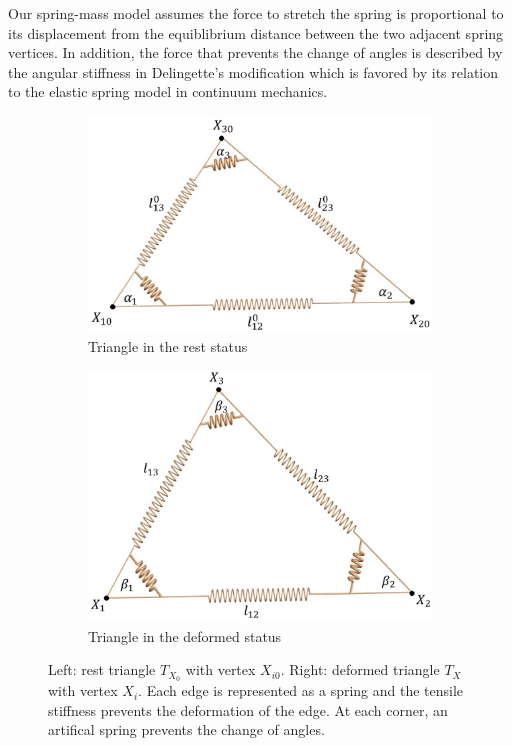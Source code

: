 Our spring-mass model \cite{LiChernKimLi12,shi2015verification} assumes the
force to stretch the spring is proportional to its displacement from the
equiblibrium distance between the two adjacent spring vertices.
In addition, the force that prevents the change of angles is described by the
angular stiffness in Delingette's modification \cite{TriangularSM} which is
favored by its relation to the elastic spring model in continuum mechanics.
\begin{figure}
\centering
\begin{subfigure}{0.48\columnwidth}
    \includegraphics[width=1.0\textwidth]{figures/rest}
    \caption{Triangle in the rest status}
\end{subfigure}
\begin{subfigure}{0.48\columnwidth}
    \includegraphics[width=1.0\textwidth]{figures/deformed}
    \caption{Triangle in the deformed status}
\end{subfigure}
\caption{Left: rest triangle $T_{X_0}$ with vertex $X_{i0}$. Right:
deformed triangle $T_{X}$ with vertex $X_{i}$. Each edge is represented as
a spring and the tensile stiffness prevents the deformation of the edge.
At each corner, an artifical spring prevents the change of angles.}
\label{fig:rest_deformed_tri}
\end{figure}

